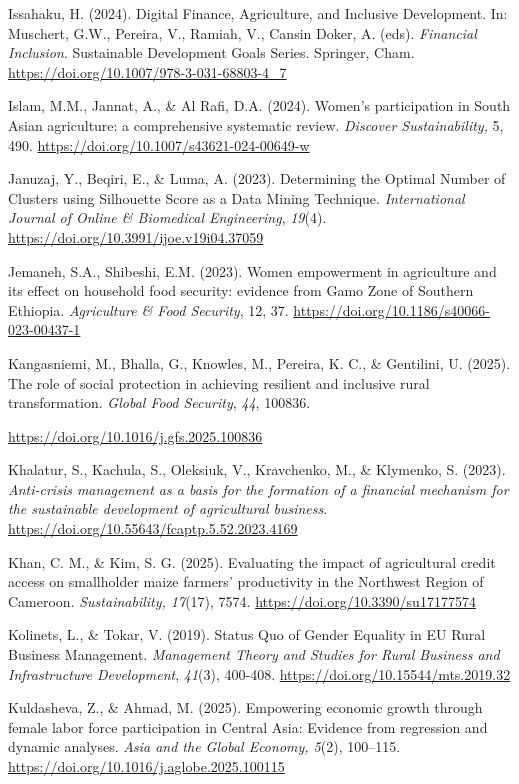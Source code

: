 \documentclass[
]{article}
\begin{document}
Issahaku, H. (2024). Digital Finance, Agriculture, and Inclusive
Development. In: Muschert, G.W., Pereira, V., Ramiah, V., Cansin Doker,
A. (eds). \emph{Financial Inclusion}. Sustainable Development Goals
Series. Springer, Cham.
\url{https://doi.org/10.1007/978-3-031-68803-4_7}

Islam, M.M., Jannat, A., \& Al Rafi, D.A. (2024). Women's participation
in South Asian agriculture: a comprehensive systematic review.
\emph{Discover Sustainability,} 5, 490.
\url{https://doi.org/10.1007/s43621-024-00649-w}

Januzaj, Y., Beqiri, E., \& Luma, A. (2023). Determining the Optimal
Number of Clusters using Silhouette Score as a Data Mining Technique.
\emph{International Journal of Online \& Biomedical Engineering},
\emph{19}(4). \url{https://doi.org/10.3991/ijoe.v19i04.37059}

Jemaneh, S.A., Shibeshi, E.M. (2023). Women empowerment in agriculture
and its effect on household food security: evidence from Gamo Zone of
Southern Ethiopia. \emph{Agriculture \& Food Security}, 12, 37.
\url{https://doi.org/10.1186/s40066-023-00437-1}

Kangasniemi, M., Bhalla, G., Knowles, M., Pereira, K. C., \& Gentilini,
U. (2025). The role of social protection in achieving resilient and
inclusive rural transformation. \emph{Global Food Security}, \emph{44},
100836.

\url{https://doi.org/10.1016/j.gfs.2025.100836}

Khalatur, S., Kachula, S., Oleksiuk, V., Kravchenko, M., \& Klymenko, S.
(2023). \emph{Anti-crisis management as a basis for the formation of a
financial mechanism for the sustainable development of agricultural
business}. \url{https://doi.org/10.55643/fcaptp.5.52.2023.4169}

Khan, C. M., \& Kim, S. G. (2025). Evaluating the impact of agricultural
credit access on smallholder maize farmers' productivity in the
Northwest Region of Cameroon. \emph{Sustainability, 17}(17), 7574.
\url{https://doi.org/10.3390/su17177574}

Kolinets, L., \& Tokar, V. (2019). Status Quo of Gender Equality in EU
Rural Business Management. \emph{Management Theory and Studies for Rural
Business and Infrastructure Development}, \emph{41}(3), 400-408.
\url{https://doi.org/10.15544/mts.2019.32}

Kuldasheva, Z., \& Ahmad, M. (2025). Empowering economic growth through
female labor force participation in Central Asia: Evidence from
regression and dynamic analyses. \emph{Asia and the Global Economy,
5}(2), 100--115. \url{https://doi.org/10.1016/j.aglobe.2025.100115}
\end{document}
